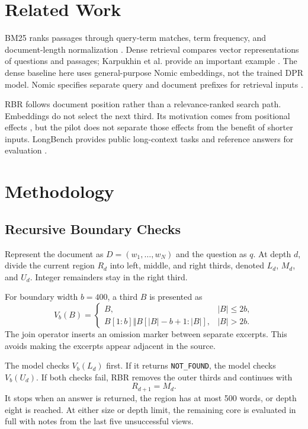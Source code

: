 \documentclass[conference]{IEEEtran}
\begin{document}
\section{Related Work}
BM25 ranks passages through query-term matches, term frequency, and document-length normalization \cite{bm25}. Dense retrieval compares vector representations of questions and passages; Karpukhin et al. provide an important example \cite{dpr}. The dense baseline here uses general-purpose Nomic embeddings, not the trained DPR model. Nomic specifies separate query and document prefixes for retrieval inputs \cite{nomic}.

RBR follows document position rather than a relevance-ranked search path. Embeddings do not select the next third. Its motivation comes from positional effects \cite{liu}, but the pilot does not separate those effects from the benefit of shorter inputs. LongBench provides public long-context tasks and reference answers for evaluation \cite{longbench}.

\section{Methodology}
\subsection{Recursive Boundary Checks}
Represent the document as $D=(w_1,\ldots,w_N)$ and the question as $q$. At depth $d$, divide the current region $R_d$ into left, middle, and right thirds, denoted $L_d$, $M_d$, and $U_d$. Integer remainders stay in the right third.

For boundary width $b=400$, a third $B$ is presented as
\begin{equation}
V_b(B)=\begin{cases}
B,&|B|\leq 2b,\\
B[1:b]\Vert B[|B|-b+1:|B|],&|B|>2b.
\end{cases}
\end{equation}
The join operator inserts an omission marker between separate excerpts. This avoids making the excerpts appear adjacent in the source.

The model checks $V_b(L_d)$ first. If it returns \texttt{NOT\_FOUND}, the model checks $V_b(U_d)$. If both checks fail, RBR removes the outer thirds and continues with
\begin{equation}
R_{d+1}=M_d.
\end{equation}
It stops when an answer is returned, the region has at most 500 words, or depth eight is reached. At either size or depth limit, the remaining core is evaluated in full with notes from the last five unsuccessful views.
\end{document}

